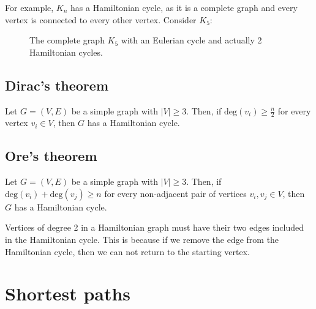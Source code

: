 \documentclass[11pt]{article}
\begin{document}
For example, $K_n$ has a Hamiltonian cycle, as it is a complete graph and every vertex is connected to every other vertex. Consider $K_5$:
\begin{figure}[H]
    \centering
    \caption{The complete graph $K_5$ with an Eulerian cycle and actually 2 Hamiltonian cycles.}
    \label{fig:graph_k5}
\end{figure}

\subsection{Dirac's theorem}
Let $G = (V,E)$ be a simple graph with $|V| \geq 3$. Then, if $\text{deg}(v_i) \geq \frac{n}{2}$ for every vertex $v_i \in V$, then $G$ has a Hamiltonian cycle.

\subsection{Ore's theorem}
Let $G = (V,E)$ be a simple graph with $|V| \geq 3$. Then, if $\text{deg}(v_i) + \text{deg}(v_j) \geq n$ for every non-adjacent pair of vertices $v_i, v_j \in V$, then $G$ has a Hamiltonian cycle.

Vertices of degree 2 in a Hamiltonian graph must have their two edges included in the Hamiltonian cycle. This is because if we remove the edge from the Hamiltonian cycle, then we can not return to the starting vertex. 

\section{Shortest paths}
\end{document}
